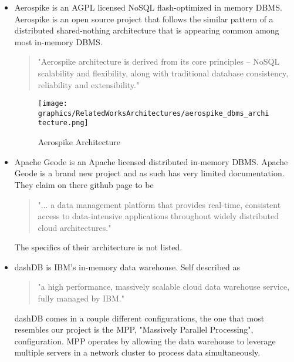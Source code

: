 \documentclass[letterpaper, 12pt]{article}
\begin{document}
	\begin{itemize}
	  \par\vspace{\baselineskip}
	  \item Aerospike is an AGPL licensed NoSQL flash-optimized in memory 
	  DBMS. Aerospike is an open source project that follows the similar pattern of 
	  a distributed shared-nothing architecture that is appearing common among most
	  in-memory DBMS. 
	  \begin{quote}
	  "Aerospike architecture is derived from its core principles – NoSQL scalability and
	  flexibility, along with traditional database consistency, reliability and
	  extensibility."
	  \cite{aerospike}
	  \end{quote}
	  \par\vspace{\baselineskip}
	  \begin{figure}
	    \centering
	    \texttt{[image: graphics/RelatedWorksArchitectures/aerospike\_dbms\_architecture.png]}
	    \caption{Aerospike Architecture}
	  \end{figure}
	  \cite{aerospike}
	  \par\vspace{\baselineskip}	
	  \item Apache Geode is an Apache licensed distributed in-memory DBMS. Apache Geode is
	  a brand new project and as such has very limited documentation. They claim on there
	  github page to be 
	  \begin{quote}
	  "... a data management platform that provides real-time, consistent access to 
	  data-intensive applications throughout widely distributed cloud architectures."
	  \cite{aerospike}
	  \end{quote}
	  The specifics of their architecture is not listed. 
	  \par\vspace{\baselineskip}
	  \item dashDB is IBM's in-memory data warehouse. Self described as 
	  \begin{quote}
	  "a high performance, massively scalable cloud data warehouse service, 
	  fully managed by IBM." \cite{dashDB}
	  \end{quote}
	  dashDB comes in a couple different configurations, the one that most resembles 
	  our project is the MPP, "Massively Parallel Processing", configuration. 
	  MPP operates by allowing the data warehouse to leverage multiple servers 
	  in a network cluster to process data simultaneously. 

\end{itemize}
\end{document}
